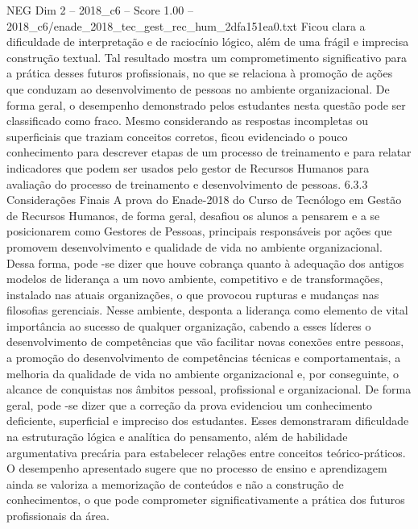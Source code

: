 \begin{textsample}{NEG Dim 2 – 2018\_c6 – Score 1.00 – 2018\_c6/enade\_2018\_tec\_gest\_rec\_hum\_2dfa151ea0.txt}
Ficou clara a dificuldade de interpretação e de raciocínio lógico, além de uma frágil e imprecisa construção textual.
Tal resultado mostra um comprometimento significativo para a prática desses futuros profissionais, no que se relaciona à promoção de ações que conduzam ao desenvolvimento de pessoas no ambiente organizacional.
De forma geral, o desempenho demonstrado pelos estudantes nesta questão pode ser classificado como fraco.
Mesmo considerando as respostas incompletas ou superficiais que traziam conceitos corretos, ficou evidenciado o pouco conhecimento para descrever etapas de um processo de treinamento e para relatar indicadores que podem ser usados pelo gestor de Recursos Humanos para avaliação do processo de treinamento e desenvolvimento de pessoas. 6.3.3 Considerações Finais A prova do Enade-2018 do Curso de Tecnólogo em Gestão de Recursos Humanos, de forma geral, desafiou os alunos a pensarem e a se posicionarem como Gestores de Pessoas, principais responsáveis por ações que promovem desenvolvimento e qualidade de vida no ambiente organizacional.
Dessa forma, pode -se dizer que houve cobrança quanto à adequação dos antigos modelos de liderança a um novo ambiente, competitivo e de transformações, instalado nas atuais organizações, o que provocou rupturas e mudanças nas filosofias gerenciais.
Nesse ambiente, desponta a liderança como elemento de vital importância ao sucesso de qualquer organização, cabendo a esses líderes o desenvolvimento de competências que vão facilitar novas conexões entre pessoas, a promoção do desenvolvimento de competências técnicas e comportamentais, a melhoria da qualidade de vida no ambiente organizacional e, por conseguinte, o alcance de conquistas nos âmbitos pessoal, profissional e organizacional.
De forma geral, pode -se dizer que a correção da prova evidenciou um conhecimento deficiente, superficial e impreciso dos estudantes.
Esses demonstraram dificuldade na estruturação lógica e analítica do pensamento, além de habilidade argumentativa precária para estabelecer relações entre conceitos teórico-práticos.
O desempenho apresentado sugere que no processo de ensino e aprendizagem ainda se valoriza a memorização de conteúdos e não a construção de conhecimentos, o que pode comprometer significativamente a prática dos futuros profissionais da área.

\end{textsample}
